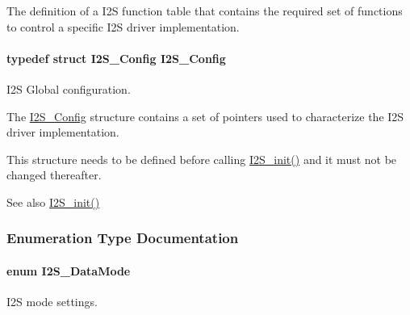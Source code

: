 The definition of a I2\+S function table that contains the required set of functions to control a specific I2\+S driver implementation. 

\paragraph[{I2\+S\+\_\+\+Config}]{\setlength{\rightskip}{0pt plus 5cm}typedef struct {\bf I2\+S\+\_\+\+Config}  {\bf I2\+S\+\_\+\+Config}}\label{_i2_s_8h_a702f29a736651810df453469ff616606}


I2\+S Global configuration. 

The \hyperlink{struct_i2_s___config}{I2\+S\+\_\+\+Config} structure contains a set of pointers used to characterize the I2\+S driver implementation.

This structure needs to be defined before calling \hyperlink{_i2_s_8h_a79e8fdf40ee80c49b2cac09a3e428a82}{I2\+S\+\_\+init()} and it must not be changed thereafter.

\begin{DoxySeeAlso}{See also}
\hyperlink{_i2_s_8h_a79e8fdf40ee80c49b2cac09a3e428a82}{I2\+S\+\_\+init()} 
\end{DoxySeeAlso}


\subsubsection{Enumeration Type Documentation}
\paragraph[{I2\+S\+\_\+\+Data\+Mode}]{\setlength{\rightskip}{0pt plus 5cm}enum {\bf I2\+S\+\_\+\+Data\+Mode}}\label{_i2_s_8h_a120b8555bc048186bbd436dbdbb5b405}


I2\+S mode settings. 

